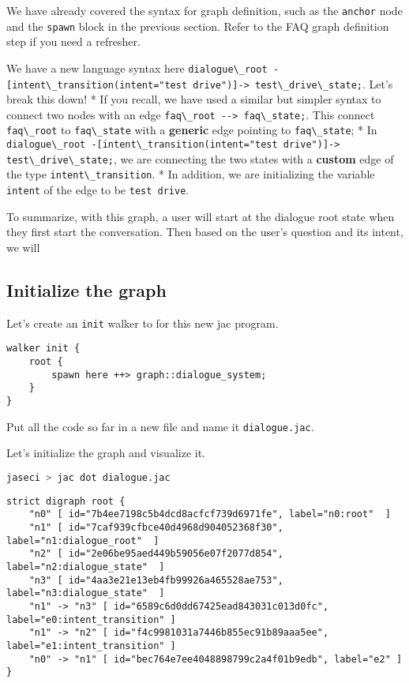 We have already covered the syntax for graph definition, such as the
\passthrough{\lstinline!anchor!} node and the
\passthrough{\lstinline!spawn!} block in the previous section. Refer to
the FAQ graph definition step if you need a refresher.

We have a new language syntax here
\passthrough{\lstinline!dialogue\_root -[intent\_transition(intent="test drive")]-> test\_drive\_state;!}.
Let's break this down! * If you recall, we have used a similar but
simpler syntax to connect two nodes with an edge
\passthrough{\lstinline!faq\_root --> faq\_state;!}. This connect
\passthrough{\lstinline!faq\_root!} to
\passthrough{\lstinline!faq\_state!} with a \textbf{generic} edge
pointing to \passthrough{\lstinline!faq\_state!}; * In
\passthrough{\lstinline!dialogue\_root -[intent\_transition(intent="test drive")]-> test\_drive\_state;!},
we are connecting the two states with a \textbf{custom} edge of the type
\passthrough{\lstinline!intent\_transition!}. * In addition, we are
initializing the variable \passthrough{\lstinline!intent!} of the edge
to be \passthrough{\lstinline!test drive!}.

To summarize, with this graph, a user will start at the dialogue root
state when they first start the conversation. Then based on the user's
question and its intent, we will

\hypertarget{initialize-the-graph-1}{%
\subsection{Initialize the graph}\label{initialize-the-graph-1}}

Let's create an \passthrough{\lstinline!init!} walker to for this new
jac program.

\begin{lstlisting}
walker init {
    root {
        spawn here ++> graph::dialogue_system;
    }
}
\end{lstlisting}

Put all the code so far in a new file and name it
\passthrough{\lstinline!dialogue.jac!}.

Let's initialize the graph and visualize it.

\begin{lstlisting}[language=bash]
jaseci > jac dot dialogue.jac
\end{lstlisting}

\begin{lstlisting}
strict digraph root {
    "n0" [ id="7b4ee7198c5b4dcd8acfcf739d6971fe", label="n0:root"  ]
    "n1" [ id="7caf939cfbce40d4968d904052368f30", label="n1:dialogue_root"  ]
    "n2" [ id="2e06be95aed449b59056e07f2077d854", label="n2:dialogue_state"  ]
    "n3" [ id="4aa3e21e13eb4fb99926a465528ae753", label="n3:dialogue_state"  ]
    "n1" -> "n3" [ id="6589c6d0dd67425ead843031c013d0fc", label="e0:intent_transition" ]
    "n1" -> "n2" [ id="f4c9981031a7446b855ec91b89aaa5ee", label="e1:intent_transition" ]
    "n0" -> "n1" [ id="bec764e7ee4048898799c2a4f01b9edb", label="e2" ]
}
\end{lstlisting}

